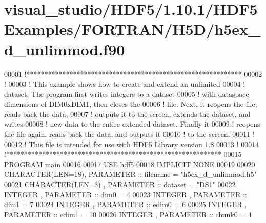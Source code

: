 \hypertarget{visual__studio_2_h_d_f5_21_810_81_2_h_d_f5_examples_2_f_o_r_t_r_a_n_2_h5_d_2h5ex__d__unlimmod_8f90_source}{}\section{visual\+\_\+studio/\+H\+D\+F5/1.10.1/\+H\+D\+F5\+Examples/\+F\+O\+R\+T\+R\+A\+N/\+H5\+D/h5ex\+\_\+d\+\_\+unlimmod.f90}
\label{visual__studio_2_h_d_f5_21_810_81_2_h_d_f5_examples_2_f_o_r_t_r_a_n_2_h5_d_2h5ex__d__unlimmod_8f90_source}

\begin{DoxyCode}
00001 \textcolor{comment}{!************************************************************}
00002 \textcolor{comment}{!}
00003 \textcolor{comment}{!  This example shows how to create and extend an unlimited}
00004 \textcolor{comment}{!  dataset.  The program first writes integers to a dataset}
00005 \textcolor{comment}{!  with dataspace dimensions of DIM0xDIM1, then closes the}
00006 \textcolor{comment}{!  file.  Next, it reopens the file, reads back the data,}
00007 \textcolor{comment}{!  outputs it to the screen, extends the dataset, and writes}
00008 \textcolor{comment}{!  new data to the entire extended dataset.  Finally it}
00009 \textcolor{comment}{!  reopens the file again, reads back the data, and outputs it}
00010 \textcolor{comment}{!  to the screen.}
00011 \textcolor{comment}{!}
00012 \textcolor{comment}{!  This file is intended for use with HDF5 Library version 1.8}
00013 \textcolor{comment}{!}
00014 \textcolor{comment}{!************************************************************}
00015 \textcolor{keyword}{PROGRAM} main
00016 
00017   \textcolor{keywordtype}{USE }hdf5
00018   \textcolor{keywordtype}{IMPLICIT NONE}
00019 
00020   \textcolor{keywordtype}{CHARACTER(LEN=18)}, \textcolor{keywordtype}{PARAMETER} :: filename = \textcolor{stringliteral}{"h5ex\_d\_unlimmod.h5"}
00021   \textcolor{keywordtype}{CHARACTER(LEN=3)} , \textcolor{keywordtype}{PARAMETER} :: dataset  = \textcolor{stringliteral}{"DS1"}
00022   \textcolor{keywordtype}{INTEGER}          , \textcolor{keywordtype}{PARAMETER} :: dim0     = 4
00023   \textcolor{keywordtype}{INTEGER}          , \textcolor{keywordtype}{PARAMETER} :: dim1     = 7
00024   \textcolor{keywordtype}{INTEGER}          , \textcolor{keywordtype}{PARAMETER} :: edim0    = 6
00025   \textcolor{keywordtype}{INTEGER}          , \textcolor{keywordtype}{PARAMETER} :: edim1    = 10
00026   \textcolor{keywordtype}{INTEGER}          , \textcolor{keywordtype}{PARAMETER} :: chunk0   = 4

\end{DoxyCode}
